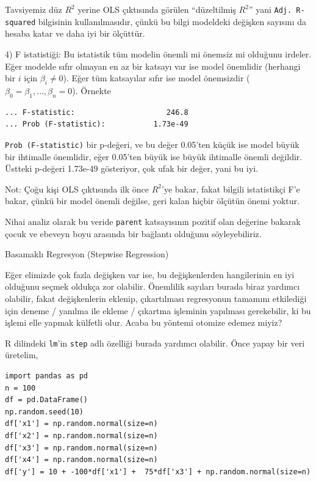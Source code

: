 \documentclass[12pt,fleqn]{article}\usepackage{../../common}
\begin{document}
Tavsiyemiz düz $R^2$ yerine OLS çıktısında görülen ``düzeltilmiş $R^2$'' yani
\verb!Adj. R-squared! bilgisinin kullanılmasıdır, çünkü bu bilgi modeldeki
değişken sayısını da hesaba katar ve daha iyi bir ölçüttür.

4) F istatistiği: Bu istatistik tüm modelin önemli mi önemsiz mi olduğunu
irdeler. Eğer modelde sıfır olmayan en az bir katsayı var ise model önemlidir
(herhangi bir $i$ için $\beta_i \ne 0$). Eğer tüm katsayılar sıfır ise model
önemsizdir ($\beta_0=\beta_1,\dots,\beta_n=0$). Örnekte

\begin{verbatim}
... F-statistic:                     246.8
... Prob (F-statistic):           1.73e-49
\end{verbatim}

\verb!Prob (F-statistic)! bir p-değeri, ve bu değer 0.05'ten küçük ise model
büyük bir ihtimalle önemlidir, eğer 0.05'ten büyük ise büyük ihtimalle önemli
değildir. Üstteki p-değeri 1.73e-49 gösteriyor, çok ufak bir değer, yani bu iyi.

Not: Çoğu kişi OLS çıktısında ilk önce $R^2$'ye bakar, fakat bilgili
istatistikçi F'e bakar, çünkü bir model önemli değilse, geri kalan hiçbir
ölçütün önemi yoktur.

Nihai analiz olarak bu veride \verb!parent! katsayısının pozitif olan değerine
bakarak çocuk ve ebeveyn boyu arasında bir bağlantı olduğunu söyleyebiliriz.

Basamaklı Regresyon (Stepwise Regression)

Eğer elimizde çok fazla değişken var ise, bu değişkenlerden hangilerinin en iyi
olduğunu seçmek oldukça zor olabilir. Önemlilik sayıları burada biraz yardımcı
olabilir, fakat değişkenlerin eklenip, çıkartılması regresyonun tamamını
etkilediği için deneme / yanılma ile ekleme / çıkartma işleminin yapılması
gerekebilir, ki bu işlemi elle yapmak külfetli olur. Acaba bu yöntemi otomize
edemez miyiz?

R dilindeki \verb!lm!'in \verb!step! adlı özelliği burada yardımcı
olabilir. Önce yapay bir veri üretelim,

\begin{verbatim}
import pandas as pd
n = 100
df = pd.DataFrame()
np.random.seed(10)
df['x1'] = np.random.normal(size=n)
df['x2'] = np.random.normal(size=n)
df['x3'] = np.random.normal(size=n)
df['x4'] = np.random.normal(size=n)
df['y'] = 10 + -100*df['x1'] +  75*df['x3'] + np.random.normal(size=n)
\end{verbatim}
\end{document}
